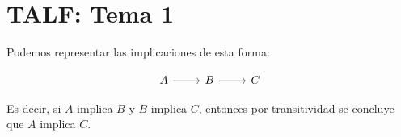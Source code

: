 \documentclass{article}
\begin{document}
\section*{TALF: Tema 1}

Podemos representar las implicaciones de esta forma:

\[
\begin{tikzcd}
A \arrow[r] & B \arrow[r] & C
\end{tikzcd}
\]

Es decir, si $A$ implica $B$ y $B$ implica $C$, entonces por transitividad
se concluye que $A$ implica $C$.
\end{document}
